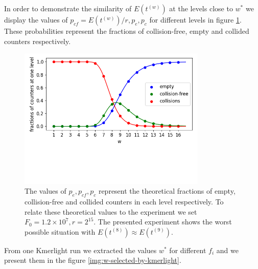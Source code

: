 In order to demonstrate the similarity of $E(t^{(w)})$ at the levels close to $w^*$ we
display the values of $p_{cf} = E(t^{(w)}) / r, p_e, p_c$ for different levels in
figure \ref{img:pe-pcf-pc}. These probabilities represent the fractions of 
collision-free, empty and collided counters respectively. 

\begin{figure}[h]
\centerline{\includegraphics[width=0.8\textwidth, trim={0cm, 3.5cm, 0cm, 0cm}, clip]{images/pcf.png}}
\caption[Plot of $p_e, p_{cf}, p_c$ across the levels]{The values of $p_e, p_{cf}, p_c$ 
represent the theoretical fractions of empty, collision-free and collided counters in
each level respectively. To relate these theoretical values to the experiment we set 
$F_0 = 1.2 \times 10^7, r = 2^{15}$. The presented experiment shows the worst possible
situation with $E(t^{(8)}) \approx E(t^{(9)})$.}
\label{img:pe-pcf-pc}
\end{figure}

From one Kmerlight run we extracted the values $w^*$ for different $f_i$ and we present them in the figure \ref{img:w-selected-by-kmerlight}.

